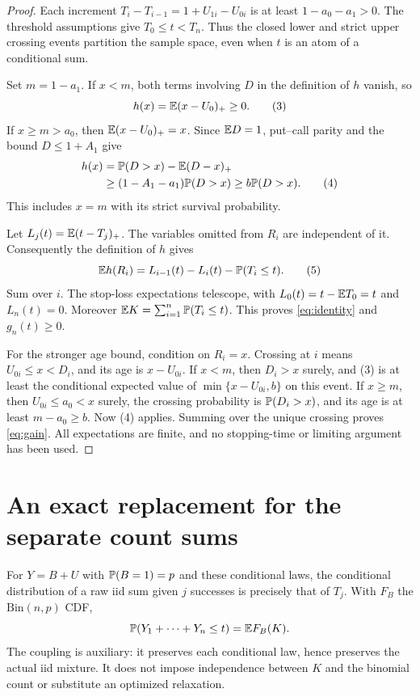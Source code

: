 \documentclass[11pt]{article}
\begin{document}
\begin{proof}
Each increment $T_i-T_{i-1}=1+U_{1i}-U_{0i}$ is at least
$1-a_0-a_1>0$. The threshold assumptions give $T_0\le t<T_n$.
Thus the closed lower and strict upper crossing events partition the
sample space, even when $t$ is an atom of a conditional sum.

Set $m=1-a_1$. If $x<m$, both terms involving $D$ in the definition
of $h$ vanish, so
\[
                         h(x)=\mathbb E(x-U_0)_+\ge0.             \tag{3}
\]
If $x\ge m>a_0$, then $\mathbb E(x-U_0)_+=x$. Since $\mathbb E D=1$,
put--call parity and the bound $D\le1+A_1$ give
\begin{align*}
 h(x)&=\mathbb P(D>x)-\mathbb E(D-x)_+\\
     &\ge(1-A_1-a_1)\mathbb P(D>x)\ge b\mathbb P(D>x).                \tag{4}
\end{align*}
This includes $x=m$ with its strict survival probability.

Let $L_j(t)=\mathbb E(t-T_j)_+$. The variables omitted from $R_i$ are
independent of it. Consequently the definition of $h$ gives
\[
 \mathbb E h(R_i)=L_{i-1}(t)-L_i(t)-\mathbb P(T_i\le t).                \tag{5}
\]
Sum over $i$. The stop-loss expectations telescope, with
$L_0(t)=t-\mathbb E T_0=t$ and $L_n(t)=0$. Moreover
$\mathbb E K=\sum_{i=1}^n\mathbb P(T_i\le t)$. This proves
\eqref{eq:identity} and $g_n(t)\ge0$.

For the stronger age bound, condition on $R_i=x$. Crossing at $i$
means $U_{0i}\le x<D_i$, and its age is $x-U_{0i}$.
If $x<m$, then $D_i>x$ surely, and (3) is at least the conditional
expected value of $\min\{x-U_{0i},b\}$ on this event.
If $x\ge m$, then $U_{0i}\le a_0<x$ surely, the crossing probability
is $\mathbb P(D_i>x)$, and its age is at least $m-a_0\ge b$.
Now (4) applies. Summing over the unique crossing proves
\eqref{eq:gain}. All expectations are finite, and no stopping-time or
limiting argument has been used.
\end{proof}

\section*{An exact replacement for the separate count sums}
For $Y=B+U$ with $\mathbb P(B=1)=p$ and these conditional laws, the conditional
distribution of a raw iid sum given $j$ successes is precisely that of
$T_j$. With $F_B$ the $\mathrm{Bin}(n,p)$ CDF,
\begin{equation}\label{eq:cdf}
            \mathbb P(Y_1+\cdots+Y_n\le t)=\mathbb E F_B(K).
\end{equation}
The coupling is auxiliary: it preserves each conditional law, hence
preserves the actual iid mixture. It does not impose independence between
$K$ and the binomial count or substitute an optimized relaxation.
\end{document}
